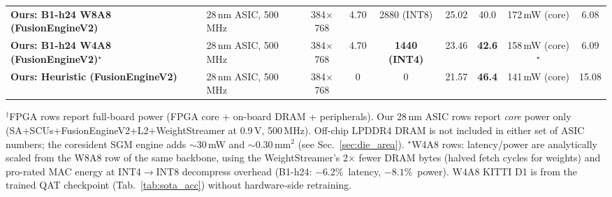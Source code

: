 \begin{table}[!t]
{\begin{tabular}{|l|l|c|c|c|c|c|c|c|}
\textbf{Ours: B1-h24 W8A8 (FusionEngineV2)}  & 28\,nm ASIC, 500\,MHz & 384$\times$768 & 4.70  & 2880 (INT8) & 25.02  & 40.0  & 172\,mW (core)  & 6.08 \\
\textbf{Ours: B1-h24 W4A8 (FusionEngineV2)$^\star$} & 28\,nm ASIC, 500\,MHz & 384$\times$768 & 4.70  & \textbf{1440 (INT4)} & 23.46 & \textbf{42.6} & 158\,mW (core)$^\star$ & 6.09 \\
\textbf{Ours: Heuristic (FusionEngineV2)}    & 28\,nm ASIC, 500\,MHz & 384$\times$768 & 0     & 0    & 21.57  & \textbf{46.4} & 141\,mW (core)  & 15.08 \\
\hline
\end{tabular}%
}
\vspace{-2pt}
\par\noindent\footnotesize$^\dagger$FPGA rows report full-board power (FPGA core + on-board DRAM + peripherals). Our 28\,nm ASIC rows report \emph{core} power only (SA+SCUs+FusionEngineV2+L2+WeightStreamer at 0.9\,V, 500\,MHz). Off-chip LPDDR4 DRAM is not included in either set of ASIC numbers; the coresident SGM engine adds $\sim$30\,mW and $\sim$0.30\,mm$^2$ (see Sec.~\ref{sec:die_area}). $^\star$W4A8 rows: latency/power are analytically scaled from the W8A8 row of the same backbone, using the WeightStreamer's 2$\times$ fewer DRAM bytes (halved fetch cycles for weights) and pro-rated MAC energy at INT4$\to$INT8 decompress overhead (B1-h24: $-6.2$\%\, latency, $-8.1$\%\, power). W4A8 KITTI D1 is from the trained QAT checkpoint (Tab.~\ref{tab:sota_acc}) without hardware-side retraining.
\vspace{-6pt}
\end{table}

